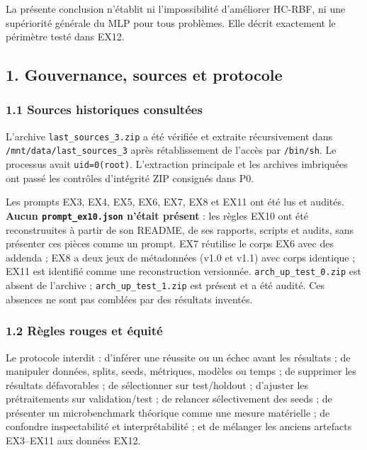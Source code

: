 \documentclass[
]{article}
\begin{document}
La présente conclusion n'établit ni l'impossibilité d'améliorer HC-RBF,
ni une supériorité générale du MLP pour tous problèmes. Elle décrit
exactement le périmètre testé dans EX12.

\subsection{1. Gouvernance, sources et
protocole}\label{gouvernance-sources-et-protocole}

\subsubsection{1.1 Sources historiques
consultées}\label{sources-historiques-consultuxe9es}

L'archive \texttt{last\_sources\_3.zip} a été vérifiée et extraite
récursivement dans \texttt{/mnt/data/last\_sources\_3} après
rétablissement de l'accès par \texttt{/bin/sh}. Le processus avait
\texttt{uid=0(root)}. L'extraction principale et les archives imbriquées
ont passé les contrôles d'intégrité ZIP consignés dans P0.

Les prompts EX3, EX4, EX5, EX6, EX7, EX8 et EX11 ont été lus et audités.
\textbf{Aucun \texttt{prompt\_ex10.json} n'était présent} : les règles
EX10 ont été reconstruuites à partir de son README, de ses rapports,
scripts et audits, sans présenter ces pièces comme un prompt. EX7
réutilise le corps EX6 avec des addenda ; EX8 a deux jeux de métadonnées
(v1.0 et v1.1) avec corps identique ; EX11 est identifié comme une
reconstruction versionnée. \texttt{arch\_up\_test\_0.zip} est absent de
l'archive ; \texttt{arch\_up\_test\_1.zip} est présent et a été audité.
Ces absences ne sont pas comblées par des résultats inventés.

\subsubsection{1.2 Règles rouges et
équité}\label{ruxe8gles-rouges-et-uxe9quituxe9}

Le protocole interdit : d'inférer une réussite ou un échec avant les
résultats ; de manipuler données, splits, seeds, métriques, modèles ou
temps ; de supprimer les résultats défavorables ; de sélectionner sur
test/holdout ; d'ajuster les prétraitements sur validation/test ; de
relancer sélectivement des seeds ; de présenter un microbenchmark
théorique comme une mesure matérielle ; de confondre inspectabilité et
interprétabilité ; et de mélanger les anciens artefacts EX3--EX11 aux
données EX12.
\end{document}
